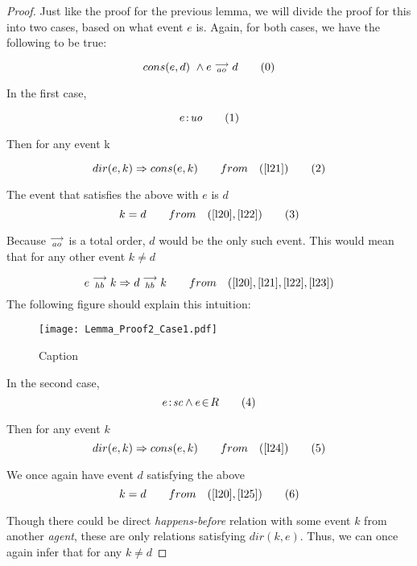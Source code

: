 \begin{proof}
    
    Just like the proof for the previous lemma, we will divide the proof for this into two cases, based on what event $e$ is. Again, for both cases, we have the following to be true:
    
    \[
        cons(e,d) \ \wedge e\stackrel{\longrightarrow}{_{ao}}d
        \tag{0}
        \label{l20}
    \]

   In the first case,
   
   \[
        e\!:\!\textit{uo} 
        \tag{1}
        \label{l21}
   \]
   
   Then for any event k
   
   \[
        dir(e,k) \Rightarrow cons(e,k) 
        \qquad from
        \quad (\ref{l21})
        \tag{2}
        \label{l22}
   \]
   
   The event that satisfies the above with $e$ is $d$
   \[
        k = d 
        \qquad from 
        \quad (\ref{l20}, \ref{l22})
        \tag{3}
        \label{l23}
   \]
   
   Because $\stackrel{\longrightarrow}{_{ao}}$ is a total order, $d$ would be the only such event. This would mean that for any other event $k \neq d$
   
   \[
        e\stackrel{\longrightarrow}{_{hb}}k \Rightarrow d\stackrel{\longrightarrow}{_{hb}}k
        \qquad from 
        \quad (\ref{l20}, \ref{l21}, \ref{l22}, \ref{l23})
   \]
   The following figure should explain this intuition:  
    
    \begin{figure}[H]
        \centering
        \texttt{[image: Lemma\_Proof2\_Case1.pdf]}
        \caption{Caption}
        \label{fig:my_label}
    \end{figure}
    
    In the second case,
    \[
        e\!:\!\textit{sc} \wedge e\!\in\!R
        \tag{4}
        \label{l24}
    \]
    
    Then for any event $k$
    \[
        dir(e,k) \Rightarrow cons(e,k)
        \qquad from \quad
        (\ref{l24})
        \tag{5}
        \label{l25}
    \]
    
    We once again have event $d$ satisfying the above   
    \[
        k = d 
        \qquad from \quad
        (\ref{l20}, \ref{l25})
        \tag{6}
        \label{l26}
    \]
    
    Though there could be direct \textit{happens-before} relation with some event $k$ from another \textit{agent}, these are only relations satisfying $dir(k,e)$. Thus, we can once again infer that for any $k \neq d$ 
    

\end{proof}
